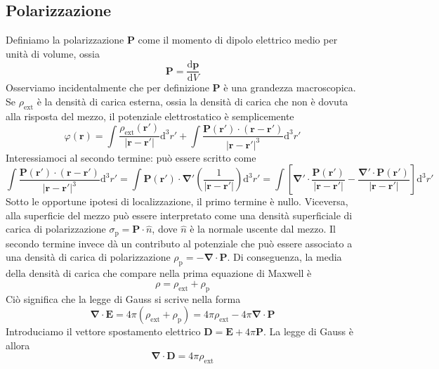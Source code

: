 \documentclass[a4paper,11pt]{book}
\renewcommand{\d}{\mathrm{d}}
\let\oldnabla\nabla
\renewcommand{\nabla}{\vec{\oldnabla}}
\renewcommand{\vec}[1]{\mathbf{#1}}
\theoremstyle{theorem}
\theoremstyle{definition}
\begin{document}
 \subsection{Polarizzazione}
 Definiamo la polarizzazione $\vec{P}$ come il momento di dipolo elettrico medio per unità di volume, ossia
 \[\vec{P}=\frac{\d \vec{p}}{\d V}\]
 Osserviamo incidentalmente che per definizione $\vec{P}$ è una grandezza macroscopica. Se $\rho_{\textrm{ext}}$ è la densità di carica esterna, ossia la densità di carica che non è dovuta alla risposta del mezzo, il potenziale elettrostatico è semplicemente
 \[\varphi(\vec{r})=\int\frac{\rho_{\textrm{ext}}(\vec{r}')}{|\vec{r}-\vec{r}'|}\d^3r'+\int\frac{\vec{P}(\vec{r}')\cdot(\vec{r}-\vec{r}')}{|\vec{r}-\vec{r}'|^3}\d^3r'\]
 Interessiamoci al secondo termine: può essere scritto come
 \[\int\frac{\vec{P}(\vec{r}')\cdot(\vec{r}-\vec{r}')}{|\vec{r}-\vec{r}'|^3}\d^3r'=\int\vec{P}(\vec{r}')\cdot\nabla'\left(\frac{1}{|\vec{r}-\vec{r}'|}\right)\d^3r'=\int\left[\nabla'\cdot\frac{\vec{P}(\vec{r'})}{|\vec{r}-\vec{r}'|}-\frac{\nabla'\cdot\vec{P}(\vec{r}')}{|\vec{r}-\vec{r}'|}\right]\d^3r'\]
 Sotto le opportune ipotesi di localizzazione, il primo termine è nullo. Viceversa, alla superficie del mezzo può essere interpretato come una densità superficiale di carica di polarizzazione $\sigma_\textrm{p}=\vec{P}\cdot\hat{n}$, dove $\hat{n}$ è la normale uscente dal mezzo. Il secondo termine invece dà un contributo al potenziale che può essere associato a una densità di carica di polarizzazione $\rho_\textrm{p}=-\nabla\cdot\vec{P}$. Di conseguenza, la media della densità di carica che compare nella prima equazione di Maxwell è
 \[\rho=\rho_\textrm{ext}+\rho_\textrm{p}\]
 Ciò significa che la legge di Gauss si scrive nella forma
 \[\nabla\cdot\vec{E}=4\pi(\rho_{\textrm{ext}}+\rho_{\textrm{p}})=4\pi\rho_\textrm{ext}-4\pi\nabla\cdot\vec{P}\]
 Introduciamo il vettore spostamento elettrico $\vec{D}=\vec{E}+4\pi\vec{P}$. La legge di Gauss è allora
 \[\nabla\cdot\vec{D}=4\pi\rho_\textrm{ext}\]
\end{document}
